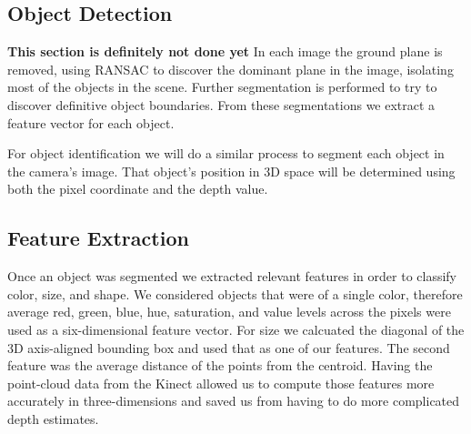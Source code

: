 \documentclass[11pt]{article}
\newcommand{\xxx}[1]{{\bf \color{red} #1}}
\begin{document}
\subsection{Object Detection}
\xxx{This section is definitely not done yet}
In each image the ground plane is removed, using RANSAC to discover the dominant
plane in the image, isolating most of the objects in the scene. Further
segmentation is performed to try to discover definitive object boundaries. From
these segmentations we extract a feature vector for each object.

For object identification we will do a similar process to segment each object in
the camera's image. That object's position in 3D space will be determined using
both the pixel coordinate and the depth value.

\subsection{Feature Extraction}

Once an object was segmented we extracted relevant features in order to classify
color, size, and shape. We considered objects that were of a single color, therefore
average red, green, blue, hue, saturation, and value levels across the pixels were
used as a six-dimensional feature vector. For size we calcuated the diagonal of the 3D
axis-aligned bounding box and used that as one of our features. The second feature was
the average distance of the points from the centroid. Having the point-cloud data from
the Kinect allowed us to compute those features more accurately in three-dimensions
and saved us from having to do more complicated depth estimates.
\end{document}
